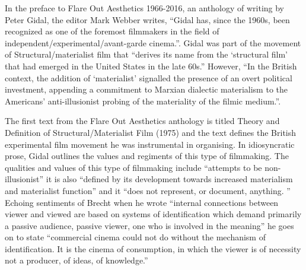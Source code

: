 \documentclass[12pt]{article}
\begin{document}
In the preface to Flare Out Aesthetics 1966-2016, an anthology of writing by Peter Gidal, the editor Mark Webber writes, ``Gidal has, since the 1960s, been recognized as one of the foremost filmmakers in the field of independent/experimental/avant-garde cinema.''\cite{Gidal:2016}. Gidal was part of the movement of Structural/materialist film that  ``derives its name from the `structural film' that had emerged in the United States in the late 60s.'' However, ``In the British context, the addition of `materialist' signalled the presence of an overt political investment, appending a commitment to Marxian dialectic materialism to the Americans' anti-illusionist probing of the materiality of the filmic medium.''\cite{Balsom:2018aa}.

The first text from the Flare Out Aesthetics anthology is titled Theory and Definition of Structural/Materialist Film (1975) and the text defines the British experimental film movement he was instrumental in organising. In idiosyncratic prose, Gidal outlines the values and regiments of this type of filmmaking. The qualities and values of this type of filmmaking include ``attempts to be non-illusionist'' it is also ``defined by its development towards increased materialism and materialist function'' and it ``does not represent, or document, anything. '' Echoing sentiments of Brecht  when he wrote ``internal connections between viewer and viewed are based on systems of identification which demand primarily a passive audience, passive viewer, one who is involved in the meaning''  he goes on to state ``commercial cinema could not do without the mechanism of identification. It is the cinema of consumption, in which the viewer is of necessity not a producer, of ideas, of knowledge.''  
\end{document}
